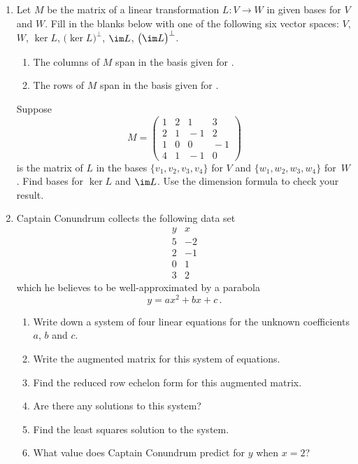\begin{enumerate}
\item Let $M$ be the matrix of a linear transformation $L:V\to W$ in given bases for $V$ and $W$.
Fill in the blanks below with one of the following six vector spaces: $V$, $W$, $\ker L$, 
$\big(\ker L\big)^\perp$, $\im L$, $\big(\im L\big)^\perp$.
\begin{enumerate}
\item The columns of $M$ span \underline{\phantom{answer}} in the basis given for \underline{\phantom{answer}}.
\item The rows of $M$ span \underline{\phantom{answer}} in the basis given for \underline{\phantom{answer}}.
\end{enumerate} 
Suppose \[M=\begin{pmatrix}1&2&1&3\\2&1&\!-1&2\\1&0&0&\!-1\\4&1&\!-1&0\end{pmatrix}\]
is the matrix of $L$ in the bases $\{v_1,v_2,v_3,v_4\}$ for $V$ and $\{w_1,w_2,w_3,w_4\}$ for~$W$.
Find bases for $\ker L$ and $\im L$. Use the dimension formula to check your result.

\item
Captain Conundrum collects the following data set
\[
\begin{array}{c|c}
y&x\\
\hline
5&-2\\
2&-1\\
0&1\\
3&2
\end{array}
\]
which he believes to be well-approximated by a parabola
\[
y=ax^2+bx+c\, .
\]

\begin{enumerate}
\item Write down a system of four linear equations for the unknown coefficients $a$, $b$ and $c$.
\item Write the augmented matrix for this system of equations.
\item Find the reduced row echelon form for this augmented matrix.
\item Are there any solutions to this system?
\item Find the least squares solution to the system.
\item What value does Captain Conundrum predict for $y$ when $x=2$? 
\end{enumerate}



\end{enumerate}
